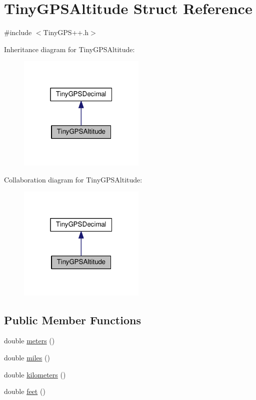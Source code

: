 \hypertarget{struct_tiny_g_p_s_altitude}{}\section{Tiny\+G\+P\+S\+Altitude Struct Reference}
\label{struct_tiny_g_p_s_altitude}


{\ttfamily \#include $<$Tiny\+G\+P\+S++.\+h$>$}



Inheritance diagram for Tiny\+G\+P\+S\+Altitude\+:\nopagebreak
\begin{figure}[H]
\begin{center}
\leavevmode
\includegraphics[width=172pt]{struct_tiny_g_p_s_altitude__inherit__graph}
\end{center}
\end{figure}


Collaboration diagram for Tiny\+G\+P\+S\+Altitude\+:\nopagebreak
\begin{figure}[H]
\begin{center}
\leavevmode
\includegraphics[width=172pt]{struct_tiny_g_p_s_altitude__coll__graph}
\end{center}
\end{figure}
\subsection*{Public Member Functions}
\begin{DoxyCompactItemize}
\item 
double \hyperlink{struct_tiny_g_p_s_altitude_a5a39d145bb1778814007206c765189f7}{meters} ()
\item 
double \hyperlink{struct_tiny_g_p_s_altitude_a5ae68d990ea08d4e21cfa6aefb46cc03}{miles} ()
\item 
double \hyperlink{struct_tiny_g_p_s_altitude_a1eb3e5b425784fc0db3e9ffe0f77f741}{kilometers} ()
\item 
double \hyperlink{struct_tiny_g_p_s_altitude_ac782babc0c485d47e6f57384e88b8cc8}{feet} ()
\end{DoxyCompactItemize}


